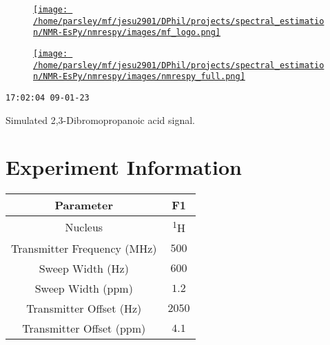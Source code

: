 \documentclass[8pt]{article}
\begin{document}
\begin{figure}[!ht]
\begin{minipage}[b][2.5cm][c]{.72\textwidth}
\href{http://foroozandeh.chem.ox.ac.uk/home}%
{\texttt{[image: /home/parsley/mf/jesu2901/DPhil/projects/spectral\_estimation/NMR-EsPy/nmrespy/images/mf\_logo.png]}}
\end{minipage}
\begin{minipage}[b][2.5cm][c]{.27\textwidth}
\href{https://foroozandehgroup.github.io/NMR-EsPy}%
{\texttt{[image: /home/parsley/mf/jesu2901/DPhil/projects/spectral\_estimation/NMR-EsPy/nmrespy/images/nmrespy\_full.png]}}
\end{minipage}
\end{figure}
\texttt{17:02:04 09-01-23}

Simulated 2,3-Dibromopropanoic acid signal.

\section*{Experiment Information}
\begin{longtable}[l]{c c}
\toprule
Parameter & F1\\
\midrule
Nucleus & \textsuperscript{1}H\\
Transmitter Frequency (MHz) & $\num{500}$\\
Sweep Width (Hz) & $\num{600}$\\
Sweep Width (ppm) & $\num{1.2}$\\
Transmitter Offset (Hz) & $\num{2050}$\\
Transmitter Offset (ppm) & $\num{4.1}$\\
\bottomrule
\end{longtable}
\end{document}
